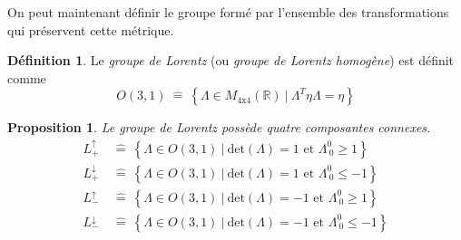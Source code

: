 \documentclass[a4paper,11pt]{report}
\theoremstyle{definition}
\theoremstyle{plain}
\newtheorem{prop}[thm]{Proposition}
\theoremstyle{definition}
\newtheorem{defn}{Définition}[chapter]
\theoremstyle{remark}
\begin{document}
            On peut maintenant définir le groupe formé par l'ensemble des transformations qui préservent cette métrique.
            \begin{defn}
                Le \textit{groupe de Lorentz} (ou \textit{groupe de Lorentz homogène}) est définit comme
                $$O(3,1)~\hat{=}~\left\{\Lambda\in M_{4\text{x}4}(\mathbb{R})~\big|~\Lambda^T\eta\Lambda = \eta\right\}$$
            \end{defn}
        
            \begin{prop}
                Le groupe de Lorentz possède quatre composantes connexes.
                \begin{align}
                    L^\uparrow_+ &~\hat{=}~ \left\{\Lambda\in O(3,1)~\big|~\text{det}(\Lambda) = 1\text{ et }\Lambda^0_{~0}\geq1\right\} \\
                    L^\downarrow_+ &~\hat{=}~ \left\{\Lambda\in O(3,1)~\big|~\text{det}(\Lambda) = 1\text{ et }\Lambda^0_{~0}\leq -1\right\} \\
                    L^\uparrow_- &~\hat{=}~ \left\{\Lambda\in O(3,1)~\big|~\text{det}(\Lambda) = -1\text{ et }\Lambda^0_{~0}\geq1\right\} \\
                    L^\downarrow_- &~\hat{=}~ \left\{\Lambda\in O(3,1)~\big|~\text{det}(\Lambda) = -1\text{ et }\Lambda^0_{~0}\leq-1\right\}
                \end{align}
            \end{prop}
\end{document}
